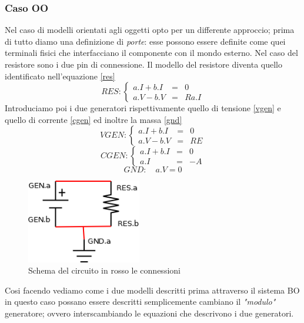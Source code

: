 \subsubsection{Caso OO}
Nel caso di modelli orientati agli oggetti opto per un differente approccio; prima di tutto diamo una definizione di \emph{porte}: esse possono essere definite come quei terminali fisici che interfacciano il componente con il mondo esterno. Nel caso del resistore sono i due pin di connessione. Il modello del resistore diventa quello identificato nell'equazione \ref{res}
\begin{equation}
\label{res}
RES:
\left\{
\begin{array}{ccc}
a.I+b.I&=&0\\
a.V-b.V&=&R a.I
\end{array}
\right .
\end{equation}
Introduciamo poi i due generatori rispettivamente quello di tensione \ref{vgen} e quello di corrente \ref{cgen} ed inoltre la massa \ref{gnd}
\begin{equation}
\label{vgen}
VGEN:
\left\{
\begin{array}{ccc}
a.I+b.I&=&0\\
a.V-b.V&=&R E
\end{array}
\right.
\end{equation}
\begin{equation}
\label{cgen}
CGEN:
\left\{
\begin{array}{ccc}
a.I+b.I&=&0\\
a.I&=&-A
\end{array}
\right.
\end{equation}
\begin{equation}
\label{gnd}
GND:\quad a.V=0
\end{equation}
\begin{figure}
\centering
\includegraphics[width=5cm]{img/circuito.png}
\caption{Schema del circuito in rosso le connessioni\label{fig:circuito}}
\end{figure}
Cosi facendo vediamo come i due modelli descritti prima attraverso il sistema BO in questo caso possano essere descritti semplicemente cambiano il \emph{"modulo"} generatore; ovvero interscambiando le equazioni che descrivono i due generatori.\\
